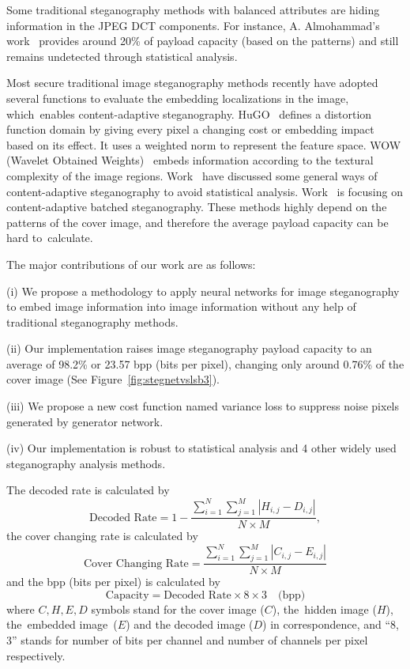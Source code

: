 \documentclass[futureinternet,article,accept,moreauthors,pdftex,10pt,a4paper]{Definitions/mdpi}
\newcommand{\abs}[1]{ \left\lvert#1\right\rvert}
\begin{document}
Some traditional steganography methods with balanced attributes are hiding information in the JPEG DCT components. For instance, A. Almohammad's work~\cite{HCJPEG} provides around 20\% of payload capacity (based on the patterns) and still remains undetected through statistical analysis.

Most secure traditional image steganography methods recently have adopted several functions to evaluate the embedding localizations in the image, which~enables content-adaptive steganography. HuGO~\cite{HuGO} defines a distortion function domain by giving every pixel a changing cost or embedding impact based on its effect. It uses a weighted norm to represent the feature space. WOW (Wavelet Obtained Weights)~\cite{WOW} embeds information according to the textural complexity of the image regions. Work~\cite{UniDistortion, CASMinStatDetect} have discussed some general ways of content-adaptive steganography to avoid statistical analysis. Work~\cite{CASBatch} is focusing on content-adaptive batched steganography. These methods highly depend on the patterns of the cover image, and therefore the average payload capacity can be hard to~calculate.

The major contributions of our work are as follows:
\begin{enumerate*}[label=\roman*)]
  \item[(i)] We propose a methodology to apply neural networks for image steganography to embed image information into image information without any help of traditional steganography methods.
  \item[(ii)] Our implementation raises image steganography payload capacity to an average of 98.2\% or 23.57 bpp (bits per pixel), changing only around 0.76\% of the cover image (See Figure~\ref{fig:stegnetvslsb3}).
  \item[(iii)] We propose a new cost function named variance loss to suppress noise pixels generated by generator network.
  \item[(iv)] Our implementation is robust to statistical analysis and 4 other widely used steganography analysis methods.
\end{enumerate*}

The decoded rate is calculated by
\begin{equation}
\textrm{Decoded Rate} = 1 - \frac{\sum_{i=1}^{N} \sum_{j=1}^{M} \abs{H_{i,j} - D_{i,j}}}{N \times M} ,
\end{equation}
the cover changing rate is calculated by
\begin{equation}
\textrm{Cover Changing Rate} = \frac{\sum_{i=1}^{N} \sum_{j=1}^{M} \abs{C_{i,j} - E_{i,j}}}{N \times M}
\end{equation}
and the bpp (bits per pixel) is calculated by
\begin{equation}
\textrm{Capacity} = \textrm{Decoded Rate} \times 8 \times 3 \quad \textrm{(bpp)}
\end{equation}
where \(C, H, E, D\) symbols stand for the cover image (\(C\)), the~hidden image (\(H\)), the~embedded image~(\(E\)) and the decoded image (\(D\)) in correspondence, and ``8, 3'' stands for number of bits per channel and number of channels per pixel respectively.
\end{document}
